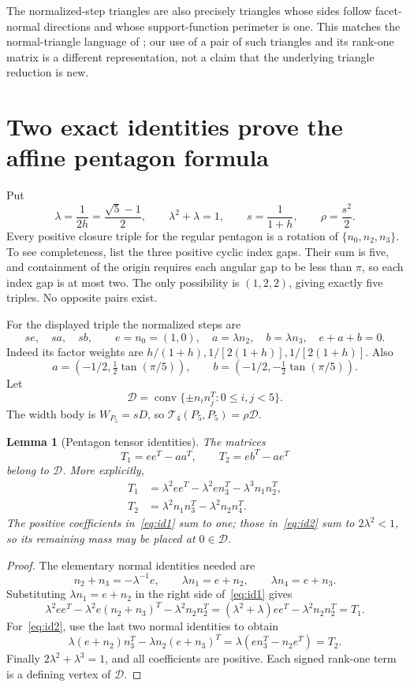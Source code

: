 \documentclass[11pt,a4paper]{article}
\newtheorem{lemma}[theorem]{Lemma}
\theoremstyle{definition}\newtheorem{definition}[theorem]{Definition}
\theoremstyle{remark}\newtheorem{remark}[theorem]{Remark}
\newcommand{\conv}{\operatorname{conv}}
\newcommand{\Tfour}{\mathcal T_4}
\begin{document}
The normalized-step triangles are also precisely triangles whose sides follow facet-normal directions and whose support-function perimeter is one. This matches the normal-triangle language of \cite[Definition 3.2]{BMP}; our use of a pair of such triangles and its rank-one matrix is a different representation, not a claim that the underlying triangle reduction is new.

\section{Two exact identities prove the affine pentagon formula}\label{sec:pent}
Put
\[
 \lambda=\frac1{2h}=\frac{\sqrt5-1}{2},\qquad
 \lambda^2+\lambda=1,\qquad s=\frac1{1+h},\qquad \rho=\frac{s^2}{2}.
\]
Every positive closure triple for the regular pentagon is a rotation of $\{n_0,n_2,n_3\}$. To see completeness, list the three positive cyclic index gaps. Their sum is five, and containment of the origin requires each angular gap to be less than $\pi$, so each index gap is at most two. The only possibility is $(1,2,2)$, giving exactly five triples. No opposite pairs exist.

For the displayed triple the normalized steps are
\[
 s e,\quad s a,\quad s b,\qquad
 e=n_0=(1,0),\quad a=\lambda n_2,\quad b=\lambda n_3,
 \quad e+a+b=0.
\]
Indeed its factor weights are $h/(1+h),1/[2(1+h)],1/[2(1+h)]$. Also
\[
 a=(-1/2,\tfrac12\tan(\pi/5)),\qquad
 b=(-1/2,-\tfrac12\tan(\pi/5)).
\]
Let
\[
 \mathcal D=\conv\{\pm n_i n_j^T:0\le i,j<5\}.
\]
The width body is $W_{P_5}=sD$, so $\Tfour(P_5,P_5)=\rho\mathcal D$.

\begin{lemma}[Pentagon tensor identities]\label{lem:identities}
The matrices
\[
 T_1=ee^T-aa^T,\qquad T_2=eb^T-ae^T
\]
belong to $\mathcal D$. More explicitly,
\begin{align}
 T_1&=\lambda^2 ee^T-\lambda^2 e n_3^T-\lambda^3 n_1n_2^T,\label{eq:id1}\\
 T_2&=\lambda^2 n_1n_3^T-\lambda^2 n_2n_4^T.\label{eq:id2}
\end{align}
The positive coefficients in~\eqref{eq:id1} sum to one; those in~\eqref{eq:id2} sum to $2\lambda^2<1$, so its remaining mass may be placed at $0\in\mathcal D$.
\end{lemma}
\begin{proof}
The elementary normal identities needed are
\[
 n_2+n_3=-\lambda^{-1}e,\qquad
 \lambda n_1=e+n_2,\qquad \lambda n_4=e+n_3.
\]
Substituting $\lambda n_1=e+n_2$ in the right side of~\eqref{eq:id1} gives
\[
 \lambda^2 ee^T-\lambda^2e(n_2+n_3)^T-\lambda^2 n_2n_2^T
 =(\lambda^2+\lambda)ee^T-\lambda^2 n_2n_2^T=T_1.
\]
For~\eqref{eq:id2}, use the last two normal identities to obtain
\[
 \lambda(e+n_2)n_3^T-\lambda n_2(e+n_3)^T
 =\lambda(en_3^T-n_2e^T)=T_2.
\]
Finally $2\lambda^2+\lambda^3=1$, and all coefficients are positive. Each signed rank-one term is a defining vertex of $\mathcal D$.
\end{proof}
\end{document}
